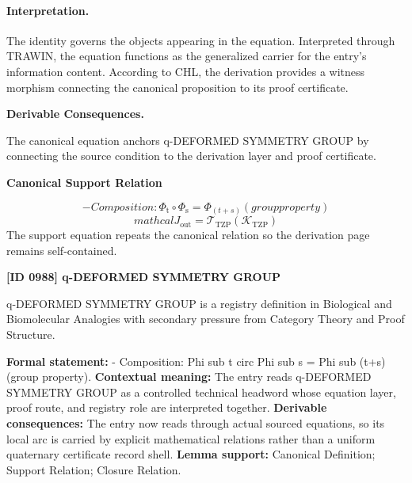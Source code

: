 \paragraph{Interpretation.}
The identity governs the objects appearing in the equation. Interpreted through TRAWIN, the equation functions as the generalized carrier for the entry’s information content. According to CHL, the derivation provides a witness morphism connecting the canonical proposition to its proof certificate.

\par\vspace{0.35em}
\noindent\textbf{Derivable Consequences.}\quad
\begingroup
\footnotesize
\raggedright
The canonical equation anchors q-DEFORMED SYMMETRY GROUP by connecting the source condition to the derivation layer and proof certificate.
\par\endgroup

\noindent\textbf{Canonical Support Relation}\par
\[
- Composition: \Phi_{\mathrm{t}} \circ \Phi_{\mathrm{s}} = \Phi_(t+s) (group property)
\]
\[
mathcal{J}_{\mathrm{out}} = \mathcal{T}_{\mathrm{TZP}}\!\left(\mathcal{K}_{\mathrm{TZP}}\right)
\]
\noindent The support equation repeats the canonical relation so the derivation page remains self-contained.\par

\clearpage
\noindent\textbf{[ID 0988] q-DEFORMED SYMMETRY GROUP}\par
\vspace{0.35em}
\begingroup\small
{}
q-DEFORMED SYMMETRY GROUP is a registry definition in Biological and Biomolecular Analogies with secondary pressure from Category Theory and Proof Structure.

\begingroup\footnotesize\setlength{\emergencystretch}{3em}\sloppy
\textbf{Formal statement:} - Composition: Phi sub t circ Phi sub s = Phi sub (t+s) (group property). \textbf{Contextual meaning:} The entry reads q-DEFORMED SYMMETRY GROUP as a controlled technical headword whose equation layer, proof route, and registry role are interpreted together. \textbf{Derivable consequences:} The entry now reads through actual sourced equations, so its local arc is carried by explicit mathematical relations rather than a uniform quaternary certificate record shell. \textbf{Lemma support:} Canonical Definition; Support Relation; Closure Relation.\par
\endgroup

